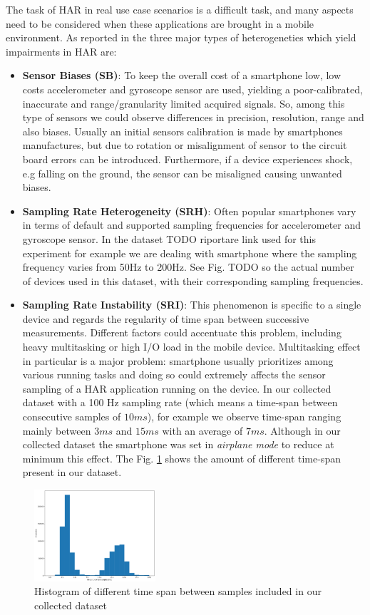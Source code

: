 The task of HAR in real use case scenarios is a difficult task, and many aspects need to be considered when these applications are brought in a mobile environment. As reported in \cite{blunck2013heterogeneity} the three major types of heterogeneties which yield impairments in HAR are:
\begin{itemize}
	\item \textbf{Sensor Biases (SB)}: To keep the overall cost of a smartphone low, low costs accelerometer and gyroscope sensor are used, yielding a poor-calibrated, inaccurate and range/granularity limited acquired signals. So, among this type of sensors we could observe differences in precision, resolution, range and also biases. Usually an initial sensors calibration is made by smartphones manufactures, but due to rotation or misalignment of sensor to the circuit board errors can be introduced. Furthermore, if a device experiences shock, e.g falling on the ground, the sensor can be misaligned causing unwanted biases.
	\item \textbf{Sampling Rate Heterogeneity (SRH)}: Often popular smartphones vary in terms of default and supported sampling frequencies for accelerometer and gyroscope sensor. In the dataset TODO riportare link used for this experiment for example we are dealing with smartphone where the sampling frequency varies from 50Hz to 200Hz. See Fig. TODO so the actual number of devices used in this dataset, with their corresponding sampling frequencies.
	\item \textbf{Sampling Rate Instability (SRI)}: This phenomenon is specific to a single device and regards the regularity of time span between successive measurements. Different factors could accentuate this problem, including heavy multitasking or high I/O load in the mobile device. Multitasking effect in particular is a major problem: smartphone usually prioritizes among various running tasks and doing so could extremely affects the sensor sampling of a HAR application running on the device. In our collected dataset with a 100 Hz sampling rate (which means a time-span between consecutive samples of $10ms$), for example we observe time-span ranging mainly between $3ms$ and $15ms$ with an average of $7ms$. Although in our collected dataset the smartphone was set in \textit{airplane mode} to reduce at minimum this effect. The Fig. \ref{time-span} shows the amount of different time-span present in our dataset.
\end{itemize}

\begin{figure}[h]
	\centering
	\includegraphics[width=0.4\textwidth]{images/interval_samples.png}
	\caption{Histogram of different time span between samples included in our collected dataset}
	\label{time-span}
\end{figure}

